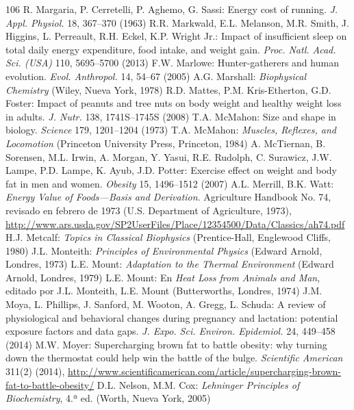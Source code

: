 \documentclass[12pt]{book}
\begin{document}
\begin{thebibliography}{106}
   R. Margaria, P. Cerretelli, P. Aghemo, G. Sassi: Energy cost of running. \textit{J. Appl. Physiol.} 18, 367--370 (1963)
   R.R. Markwald, E.L. Melanson, M.R. Smith, J. Higgins, L. Perreault, R.H. Eckel, K.P. Wright Jr.: Impact of insufficient sleep on total daily energy expenditure, food intake, and weight gain. \textit{Proc. Natl. Acad. Sci. (USA)} 110, 5695--5700 (2013)
   F.W. Marlowe: Hunter-gatherers and human evolution. \textit{Evol. Anthropol.} 14, 54--67 (2005)
   A.G. Marshall: \textit{Biophysical Chemistry} (Wiley, Nueva York, 1978)
   R.D. Mattes, P.M. Kris-Etherton, G.D. Foster: Impact of peanuts and tree nuts on body weight and healthy weight loss in adults. \textit{J. Nutr.} 138, 1741S--1745S (2008)
   T.A. McMahon: Size and shape in biology. \textit{Science} 179, 1201--1204 (1973)
   T.A. McMahon: \textit{Muscles, Reflexes, and Locomotion} (Princeton University Press, Princeton, 1984)
   A. McTiernan, B. Sorensen, M.L. Irwin, A. Morgan, Y. Yasui, R.E. Rudolph, C. Surawicz, J.W. Lampe, P.D. Lampe, K. Ayub, J.D. Potter: Exercise effect on weight and body fat in men and women. \textit{Obesity} 15, 1496--1512 (2007)
   A.L. Merrill, B.K. Watt: \textit{Energy Value of Foods---Basis and Derivation}. Agriculture Handbook No. 74, revisado en febrero de 1973 (U.S. Department of Agriculture, 1973), \url{http://www.ars.usda.gov/SP2UserFiles/Place/12354500/Data/Classics/ah74.pdf}
   H.J. Metcalf: \textit{Topics in Classical Biophysics} (Prentice-Hall, Englewood Cliffs, 1980)
   J.L. Monteith: \textit{Principles of Environmental Physics} (Edward Arnold, Londres, 1973)
   L.E. Mount: \textit{Adaptation to the Thermal Environment} (Edward Arnold, Londres, 1979)
   L.E. Mount: En \textit{Heat Loss from Animals and Man}, editado por J.L. Monteith, L.E. Mount (Butterworths, Londres, 1974)
   J.M. Moya, L. Phillips, J. Sanford, M. Wooton, A. Gregg, L. Schuda: A review of physiological and behavioral changes during pregnancy and lactation: potential exposure factors and data gaps. \textit{J. Expo. Sci. Environ. Epidemiol.} 24, 449--458 (2014)
   M.W. Moyer: Supercharging brown fat to battle obesity: why turning down the thermostat could help win the battle of the bulge. \textit{Scientific American} 311(2) (2014), \url{http://www.scientificamerican.com/article/supercharging-brown-fat-to-battle-obesity/}
   D.L. Nelson, M.M. Cox: \textit{Lehninger Principles of Biochemistry}, 4.ª ed. (Worth, Nueva York, 2005)

\end{thebibliography}
\end{document}
